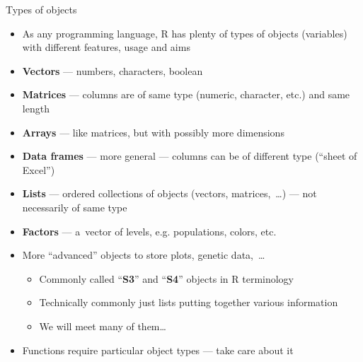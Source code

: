 \documentclass[compress, ucs, xelatex, 11pt, xcolor=svgnames, aspectratio=169,
	hyperref={
		bookmarks=true,
		unicode=true,
		colorlinks=true,
		pdftitle={Molecular data in R},
		plainpages=false,
		pdfauthor={Vojtech Zeisek},
		pdfsubject={Course about phylogeny and evolution in R},
		pdfcreator={XeLaTeX},
		pdfkeywords={R, evolution, phylogeny, molecular data},
		linkcolor=Crimson, %
		anchorcolor=Magenta, %
		citecolor=Magenta, %
		filecolor=Magenta, %
		menucolor=Magenta, %
		urlcolor=DodgerBlue, %
		pdftex},
	url={hyphens, lowtilde} %
	]{beamer}
\begin{document}
\begin{frame}{Types of objects}
	\begin{itemize}
		\item As any programming language, R has plenty of types of objects (variables) with different features, usage and aims
		\item \textbf{Vectors} --- numbers, characters, boolean
		\item \textbf{Matrices} --- columns are of same type (numeric, character, etc.) and same length
		\item \textbf{Arrays} --- like matrices, but with possibly more dimensions
		\item \textbf{Data frames} --- more general --- columns can be of different type (\enquote{sheet of Excel})
		\item \textbf{Lists} --- ordered collections of objects (vectors, matrices,~\ldots) --- not necessarily of same type
		\item \textbf{Factors} --- a~vector of levels, e.g. populations, colors, etc.
		\item More \enquote{advanced} objects to store plots, genetic data,~\ldots
		\begin{itemize}
			\item Commonly called \enquote{\textbf{S3}} and \enquote{\textbf{S4}} objects in R terminology
			\item Technically commonly just lists putting together various information
			\item We will meet many of them\ldots
		\end{itemize}
	\item Functions require particular object types --- take care about it
	\end{itemize}
\end{frame}
\end{document}
